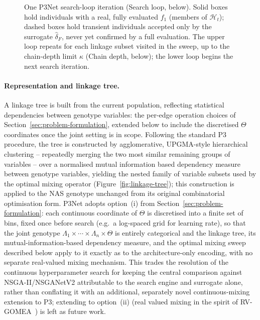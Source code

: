\begin{figure}[t]
{%
    }
    \caption{One P3Net search-loop iteration (Search loop, below). Solid boxes hold individuals with a
    real, fully evaluated $f_1$ (members of $\mathcal{H}_t$); dashed boxes hold transient individuals
    accepted only by the surrogate $\hat\delta_F$, never yet confirmed by a full evaluation. The upper loop
    repeats for each linkage subset visited in the sweep, up to the chain-depth limit $\kappa$
    (Chain depth, below); the lower loop begins the next search iteration.}
    \label{fig:p3net-loop}
\end{figure}

\paragraph{Representation and linkage tree.} A linkage tree is built from the current population, reflecting statistical dependencies between genotype variables: the per-edge operation choices of Section~\ref{sec:problem-formulation}, extended below to include the discretised $\Theta$ coordinates once the joint setting is in scope. Following the standard P3 procedure, the tree is constructed by agglomerative, UPGMA-style hierarchical clustering -- repeatedly merging the two most similar remaining groups of variables -- over a normalised mutual information based dependency measure between genotype variables, yielding the nested family of variable subsets used by the optimal mixing operator (Figure~\ref{fig:linkage-tree}); this construction is applied to the NAS genotype unchanged from its original combinatorial optimisation form. P3Net adopts option~(i) from Section~\ref{sec:problem-formulation}: each continuous coordinate of $\Theta$ is discretised into a finite set of bins, fixed once before search (e.g.\ a log-spaced grid for learning rate), so that the joint genotype $\Lambda_1 \times \cdots \times \Lambda_n \times \Theta$ is entirely categorical and the linkage tree, its mutual-information-based dependency measure, and the optimal mixing sweep described below apply to it exactly as to the architecture-only encoding, with no separate real-valued mixing mechanism. This trades the resolution of the continuous hyperparameter search for keeping the central comparison against NSGA-II/NSGANetV2 attributable to the search engine and surrogate alone, rather than conflating it with an additional, separately novel continuous-mixing extension to P3; extending to option~(ii) (real valued mixing in the spirit of RV-GOMEA~\citep{andreadis2024maxclique}) is left as future work.

